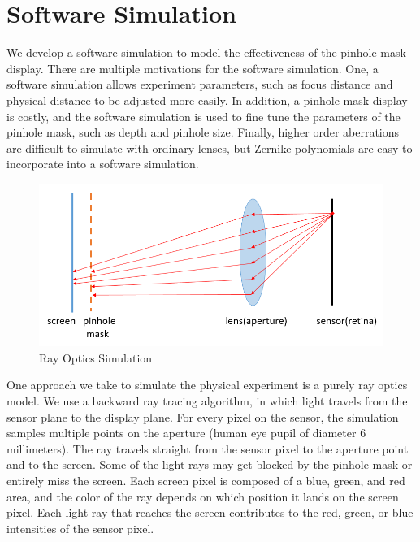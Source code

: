 \chapter{Software Simulation}

We develop a software simulation to model the effectiveness of the pinhole mask display. There are multiple motivations for the software simulation. One, a software simulation allows experiment parameters, such as focus distance and physical distance to be adjusted more easily. In addition, a pinhole mask display is costly, and the software simulation is used to fine tune the parameters of the pinhole mask, such as depth and pinhole size. Finally, higher order aberrations are difficult to simulate with ordinary lenses, but Zernike polynomials are easy to incorporate into a software simulation.

\begin{figure}[ht]
  \centering
  \includegraphics[width=5in]{chapters/chapter6/images/Ray_Simulation.png}
  \caption{Ray Optics Simulation}
  \label{fig:ray_optics}
\end{figure}

One approach we take to simulate the physical experiment is a purely ray optics model. We use a backward ray tracing algorithm, in which light travels from the sensor plane to the display plane. For every pixel on the sensor, the simulation samples multiple points on the aperture (human eye pupil of diameter 6 millimeters). The ray travels straight from the sensor pixel to the aperture point and to the screen. Some of the light rays may get blocked by the pinhole mask or entirely miss the screen. Each screen pixel is composed of a blue, green, and red area, and the color of the ray depends on which position it lands on the screen pixel. Each light ray that reaches the screen contributes to the red, green, or blue intensities of the sensor pixel.

